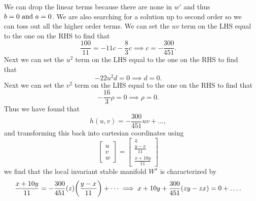\documentclass[12pt]{report}
\begin{document}
\begin{solution}
\begin{enumerate}
        We can drop the linear terms because there are none in $w'$ and thus $b = 0  {~\text{and}~} a = 0$. We are also searching for a solution up to second order so we can toss out all the higher order terms. We can set the $uv$ term on the LHS equal to the one on the RHS to find that
        \[ 
           \frac{100}{11} = -11c - \frac{8}{3}c  \implies c = -\frac{300}{451}.
        \]
        Next we can set the $u^2$ term on the LHS equal to the one on the RHS to find that 
        \[
            -22u^2d = 0 \implies d = 0.
        \] 
        Next we can set the $v^2$ term on the LHS equal to the one on the RHS to find that 
        \[
            -\frac{16}{3}\rho = 0 \implies \rho = 0.
        \] 
        Thus we have found that 
        \[ 
            h(u,v) = - \frac{300}{451}uv + \dots,
        \]
        and transforming this back into cartesian coordinates using 
        \[ 
            \begin{bmatrix}
                u\\v\\w
            \end{bmatrix} = \begin{bmatrix}
                z\\ \frac{y - x}{11} \\ \frac{x + 10y}{11}
            \end{bmatrix}
        \]
        we find that the local invariant stable manifold $W^s$ is characterized by  
        \[ 
            \frac{x + 10y}{11} = -\frac{300}{451}(z){\left(\frac{y-x}{11}\right)} + \dots \implies x + 10 y + \frac{300}{451}(zy - zx) = 0 + \dots.
        \]


\end{enumerate}
\end{solution}
\end{document}
